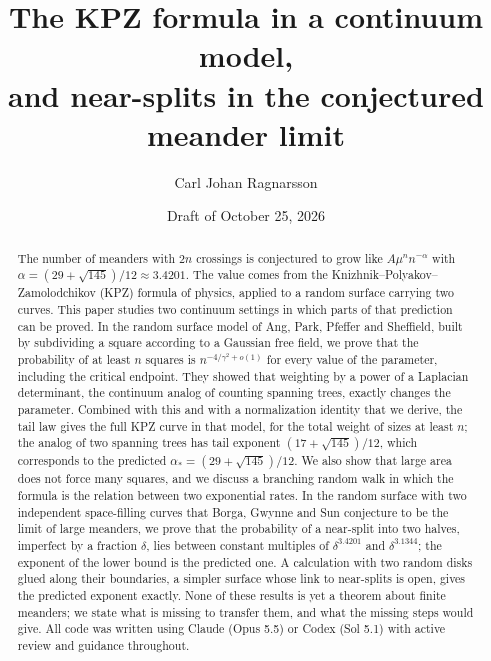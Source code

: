 \documentclass[11pt]{article}
\title{The KPZ formula in a continuum model,\\ and near-splits in the conjectured meander limit%
\seriesline{Paper D.}}
\author{Carl Johan Ragnarsson}
\date{Draft of October 25, 2026}
\begin{document}
\maketitle

\begin{abstract}
The number of meanders with $2n$ crossings is conjectured to grow like $A\mu^n n^{-\alpha}$ with
$\alpha=(29+\sqrt{145})/12\approx3.4201$. The value comes from the Knizhnik--Polyakov--Zamolodchikov
(KPZ) formula of physics, applied to a random surface carrying two curves. This paper studies two
continuum settings in which parts of that prediction can be proved. In the random surface model
of Ang, Park, Pfeffer and Sheffield, built by subdividing a square according to a Gaussian free
field, we prove that the probability of at least $n$ squares is $n^{-4/\gamma^2+o(1)}$ for every
value of the parameter, including the critical endpoint. They showed that weighting by a power of
a Laplacian determinant, the continuum analog of counting spanning trees, exactly changes the
parameter. Combined with this and with a normalization identity that we derive, the tail law gives
the full KPZ curve in that model, for the total weight of sizes at least $n$; the analog of two
spanning trees has tail exponent $(17+\sqrt{145})/12$, which corresponds to the predicted
$\alpha_*=(29+\sqrt{145})/12$. We also show that large area does not force many squares, and we discuss a
branching random walk in which the formula is the relation between two exponential rates. In the
random surface with two independent space-filling curves that Borga, Gwynne and Sun conjecture to
be the limit of large meanders, we prove that the probability of a near-split into two halves,
imperfect by a fraction $\delta$, lies between constant multiples of $\delta^{3.4201}$ and
$\delta^{3.1344}$; the exponent of the lower bound is the predicted one. A calculation with two
random disks glued along their boundaries, a simpler surface whose link to near-splits is open,
gives the predicted exponent exactly. None of these results is yet a theorem about finite
meanders; we state what is missing to transfer them, and what the missing steps would give. All code was written using Claude (Opus
5.5) or Codex (Sol 5.1) with active review and guidance throughout.
\end{abstract}
















\clearpage
\appendix



{\footnotesize}
\end{document}
